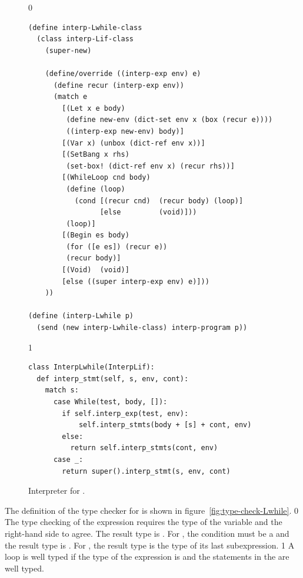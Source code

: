 \documentclass[7x10]{TimesAPriori_MIT}%
\def\racketEd{0}
\def\pythonEd{1}
\providecommand{\BookEdition}{1}
\let\edition\BookEdition
\newcommand{\pythonColor}[0]{}
\numberwithin{theorem}{chapter}
\numberwithin{definition}{chapter}
\numberwithin{equation}{chapter}
\begin{document}
\begin{figure}[tbp]
\begin{tcolorbox}[colback=white]  
{\if\edition\racketEd    
\begin{lstlisting}[basicstyle=\ttfamily\footnotesize]
(define interp-Lwhile-class
  (class interp-Lif-class
    (super-new)

    (define/override ((interp-exp env) e)
      (define recur (interp-exp env))
      (match e
        [(Let x e body)
         (define new-env (dict-set env x (box (recur e))))
         ((interp-exp new-env) body)]
        [(Var x) (unbox (dict-ref env x))]
        [(SetBang x rhs)
         (set-box! (dict-ref env x) (recur rhs))]
        [(WhileLoop cnd body)
         (define (loop)
           (cond [(recur cnd)  (recur body) (loop)]
                 [else         (void)]))
         (loop)]
        [(Begin es body)
         (for ([e es]) (recur e))
         (recur body)]
        [(Void)  (void)]
        [else ((super interp-exp env) e)]))
    ))

(define (interp-Lwhile p)
  (send (new interp-Lwhile-class) interp-program p))
\end{lstlisting}
\fi}
{\if\edition\pythonEd\pythonColor
\begin{lstlisting}
class InterpLwhile(InterpLif):
  def interp_stmt(self, s, env, cont):
    match s:
      case While(test, body, []):
        if self.interp_exp(test, env):
            self.interp_stmts(body + [s] + cont, env)
        else:
          return self.interp_stmts(cont, env)
      case _:
        return super().interp_stmt(s, env, cont)
\end{lstlisting}
\fi}
\end{tcolorbox}

\caption{Interpreter for \LangLoop{}.}
\label{fig:interp-Lwhile}
\end{figure}

The definition of the type checker for \LangLoop{} is shown in
figure~\ref{fig:type-check-Lwhile}.
%
{\if\edition\racketEd    
%
The type checking of the  expression requires the type
of the variable and the right-hand side to agree. The result type is
. For , the condition must be a \BOOLTY{}
and the result type is .  For , the result type
is the type of its last subexpression.
%
\fi}
%
{\if\edition\pythonEd\pythonColor
%
A  loop is well typed if the type of the 
expression is  and the statements in the  are
well typed.
%
\fi}
\end{document}
